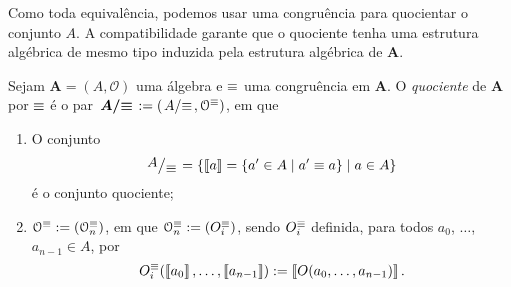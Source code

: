 Como toda equivalência, podemos usar uma congruência para quocientar o conjunto $A$. A compatibilidade garante que o quociente tenha uma estrutura algébrica de mesmo tipo induzida pela estrutura algébrica de $\bm A$.

\begin{definition}
Sejam $\bm A = (A,\mathcal O)$ uma álgebra e $\equiv$ uma congruência em $\bm A$. O \emph{quociente} de $\bm A$ por $\equiv$ é o par $\bm{\quo{A}{\congr}} := (\quo{A}{\congr},\mathcal O^\congr)$, em que
	\begin{enumerate}
		\item O conjunto
			\begin{equation*}
				\quo{A}{\congr} = \set{\cla{a} = \set{a' \in A}{a' \congr a}}{a \in A}
			\end{equation*}
		é o conjunto quociente;

		\item $\mathcal O^\equiv := (\mathcal O_n^\equiv)$, em que $\mathcal O_n^\equiv := (O_i^\equiv)$, sendo $O_i^\equiv$ definida, para todos $a_0$, $\ldots$, $a_{n-1} \in A$, por
			\begin{equation*}
				O_i^\equiv(\left\llbracket{a_0}\right\rrbracket,\ldots,\left\llbracket{a_{n-1}}\right\rrbracket) := \left\llbracket{O(a_0,\ldots,a_{n-1})}\right\rrbracket.
			\end{equation*}
	\end{enumerate}
\end{definition}

